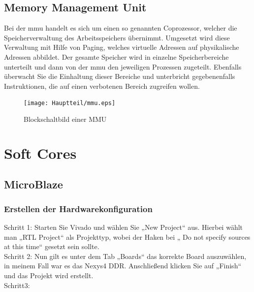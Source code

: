 \section{Memory Management Unit}\label{kap:mmu}

Bei der \ac{mmu} handelt es sich um einen so genannten Coprozessor, welcher die Speicherverwaltung des Arbeitsspeichers übernimmt. Umgesetzt wird diese Verwaltung mit
Hilfe von Paging, welches virtuelle Adressen auf physikalische Adressen abbildet. Der gesamte Speicher wird in einzelne Speicherbereiche unterteilt und dann von der
\ac{mmu} den jeweiligen Prozessen zugeteilt. Ebenfalls überwacht Sie die Einhaltung dieser Bereiche und unterbricht gegebenenfalls Instruktionen, die auf einen verbotenen
Bereich zugreifen wollen.\cite{itwissen}\\

\begin{figure}[H]
\centering
\texttt{[image: Hauptteil/mmu.eps]}
\caption{Blockschaltbild einer MMU}\label{fig:mmu}
\end{figure}








\chapter{Soft Cores}\label{kap:softcores}
\newpage
\section{MicroBlaze}\label{kap:microblaze}



\subsection{Erstellen der Hardwarekonfiguration}\label{kap:microblazehardware}


Schritt 1:
Starten Sie Vivado und wählen Sie „New Project“ aus.
Hierbei wählt man „RTL Project“ als Projekttyp, wobei der Haken bei „ Do not specify sources at this time“ gesetzt sein sollte.\\

Schritt 2:
Nun gilt es unter dem Tab „Boards“ das korrekte Board auszuwählen, in meinem Fall war es das Nexys4 DDR.
Anschließend klicken Sie auf „Finish“ und das Projekt wird erstellt.\\


Schritt3:


